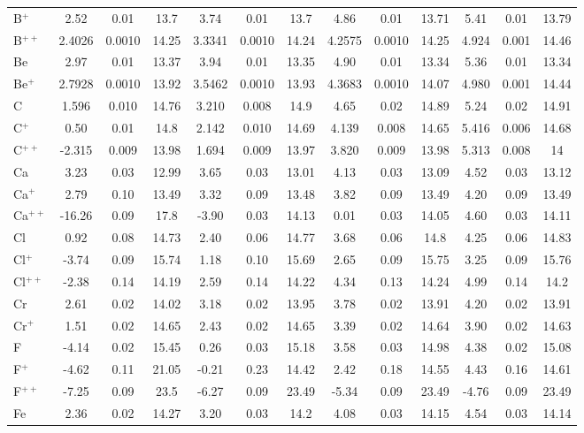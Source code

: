 \begin{longtable}{l!{\vrule width 0.25pt}ccc!{\vrule width 0.25pt}ccc!{\vrule width 0.25pt}ccc!{\vrule width 0.25pt}ccc}
B$^+$ & 2.52 & 0.01 & 13.7 & 3.74 & 0.01 & 13.7 & 4.86 & 0.01 & 13.71 & 5.41 & 0.01 & 13.79 \\
B$^{++}$ & 2.4026 & 0.0010 & 14.25 & 3.3341 & 0.0010 & 14.24 & 4.2575 & 0.0010 & 14.25 & 4.924 & 0.001 & 14.46 \\
Be & 2.97 & 0.01 & 13.37 & 3.94 & 0.01 & 13.35 & 4.90 & 0.01 & 13.34 & 5.36 & 0.01 & 13.34 \\
Be$^+$ & 2.7928 & 0.0010 & 13.92 & 3.5462 & 0.0010 & 13.93 & 4.3683 & 0.0010 & 14.07 & 4.980 & 0.001 & 14.44 \\
C & 1.596 & 0.010 & 14.76 & 3.210 & 0.008 & 14.9 & 4.65 & 0.02 & 14.89 & 5.24 & 0.02 & 14.91 \\
C$^+$ & 0.50 & 0.01 & 14.8 & 2.142 & 0.010 & 14.69 & 4.139 & 0.008 & 14.65 & 5.416 & 0.006 & 14.68 \\
C$^{++}$ & -2.315 & 0.009 & 13.98 & 1.694 & 0.009 & 13.97 & 3.820 & 0.009 & 13.98 & 5.313 & 0.008 & 14 \\
Ca & 3.23 & 0.03 & 12.99 & 3.65 & 0.03 & 13.01 & 4.13 & 0.03 & 13.09 & 4.52 & 0.03 & 13.12 \\
Ca$^+$ & 2.79 & 0.10 & 13.49 & 3.32 & 0.09 & 13.48 & 3.82 & 0.09 & 13.49 & 4.20 & 0.09 & 13.49 \\
Ca$^{++}$ & -16.26 & 0.09 & 17.8 & -3.90 & 0.03 & 14.13 & 0.01 & 0.03 & 14.05 & 4.60 & 0.03 & 14.11 \\
Cl & 0.92 & 0.08 & 14.73 & 2.40 & 0.06 & 14.77 & 3.68 & 0.06 & 14.8 & 4.25 & 0.06 & 14.83 \\
Cl$^+$ & -3.74 & 0.09 & 15.74 & 1.18 & 0.10 & 15.69 & 2.65 & 0.09 & 15.75 & 3.25 & 0.09 & 15.76 \\
Cl$^{++}$ & -2.38 & 0.14 & 14.19 & 2.59 & 0.14 & 14.22 & 4.34 & 0.13 & 14.24 & 4.99 & 0.14 & 14.2 \\
Cr & 2.61 & 0.02 & 14.02 & 3.18 & 0.02 & 13.95 & 3.78 & 0.02 & 13.91 & 4.20 & 0.02 & 13.91 \\
Cr$^+$ & 1.51 & 0.02 & 14.65 & 2.43 & 0.02 & 14.65 & 3.39 & 0.02 & 14.64 & 3.90 & 0.02 & 14.63 \\
F & -4.14 & 0.02 & 15.45 & 0.26 & 0.03 & 15.18 & 3.58 & 0.03 & 14.98 & 4.38 & 0.02 & 15.08 \\
F$^+$ & -4.62 & 0.11 & 21.05 & -0.21 & 0.23 & 14.42 & 2.42 & 0.18 & 14.55 & 4.43 & 0.16 & 14.61 \\
F$^{++}$ & -7.25 & 0.09 & 23.5 & -6.27 & 0.09 & 23.49 & -5.34 & 0.09 & 23.49 & -4.76 & 0.09 & 23.49 \\
Fe & 2.36 & 0.02 & 14.27 & 3.20 & 0.03 & 14.2 & 4.08 & 0.03 & 14.15 & 4.54 & 0.03 & 14.14 \\

\end{longtable}
